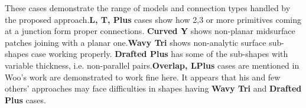 These cases demonstrate the range of models and connection types handled by the proposed approach.\textbf{L, T, Plus} cases show how 2,3 or more primitives coming at a junction form proper connections. \textbf{Curved Y} shows non-planar midsurface patches joining with a planar one.\textbf{Wavy Tri} shows non-analytic surface sub-shapes case working properly. \textbf{Drafted Plus} has some of the sub-shapes with variable thickness, i.e. non-parallel pairs.\textbf{Overlap, LPlus} cases are mentioned in Woo's \cite{Woo2013} work are demonstrated to work fine here. It appears that his and few others' \cite{ Chong2004, Boussuge2014, Zhu2015} approaches may face difficulties in shapes having \textbf{Wavy Tri} and  \textbf{Drafted Plus} cases.


